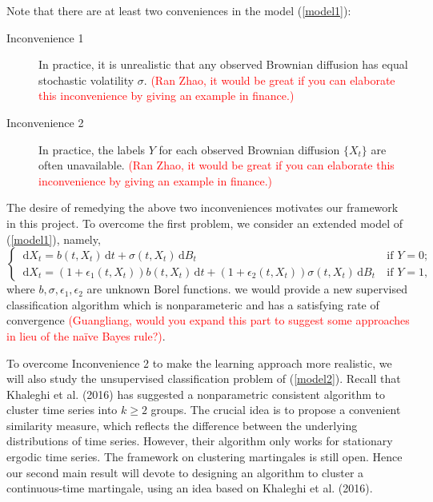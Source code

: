 \documentclass[9pt,a4paper]{article}
\def\ud{\, \mathrm{d}}
\begin{document}
  Note that there are at least two conveniences in the model (\ref{model1}):
  \begin{description}
  \item[Inconvenience 1] In practice, it is unrealistic that any observed Brownian diffusion has equal stochastic volatility $\sigma$. \textcolor{red}{(Ran Zhao, it would be great if you can elaborate this inconvenience by giving an example in finance.)}
  \item[Inconvenience 2] In practice, the labels $Y$ for each observed Brownian diffusion $\{X_t\}$ are often unavailable. \textcolor{red}{(Ran Zhao, it would be great if you can elaborate this inconvenience by giving an example in finance.)}
  \end{description}
 The desire of remedying the above two inconveniences  motivates our framework in this project. To overcome the first problem, we consider an extended model of (\ref{model1}), namely,
   \begin{equation}
\label{model2}
\left\{
\begin{array}{ll}
\ud X_t= b(t,X_t)\ud t+\sigma(t,X_t)\ud B_t&~\mbox{if $Y=0$};\\
\ud X_t= (1+\epsilon_1(t,X_t))b(t,X_t)\ud t+(1+\epsilon_2(t,X_t))\sigma(t,X_t)\ud B_t&~\mbox{if $Y=1$},
\end{array}\right.
\end{equation}
where $b,\sigma,\epsilon_1,\epsilon_2$ are unknown Borel functions. we would provide a new supervised classification algorithm which is nonparameteric and has a satisfying rate of convergence \textcolor{red}{(Guangliang, would you expand this part to suggest some approaches in lieu of the na\"ive Bayes rule?)}.

 To overcome Inconvenience 2 to make the learning approach more realistic, we will also study the unsupervised classification problem of (\ref{model2}). Recall that Khaleghi et al. (2016) has suggested a nonparametric consistent algorithm to cluster time series into $k\ge2$ groups. The crucial idea is to propose a convenient similarity measure, which reflects the difference between the underlying distributions of time series. However, their algorithm only works for stationary ergodic time series. The framework on clustering martingales is still open. Hence our second main result will devote to designing an algorithm to cluster a continuous-time martingale, using an idea based on Khaleghi et al. (2016).
\end{document}
